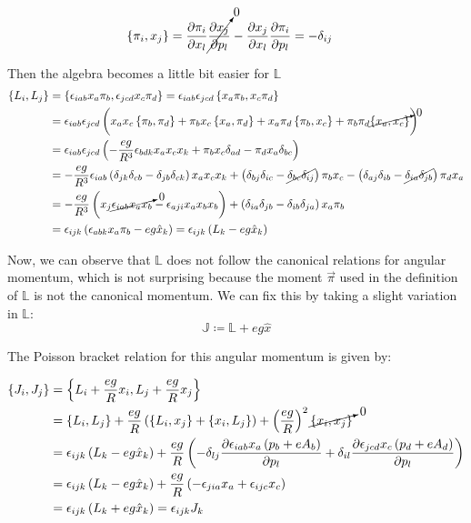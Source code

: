 \begin{align*}
\left\lbrace \pi_i, x_j \right\rbrace &= \frac{\partial \pi_i}{\partial x_l}\cancelto{0}{\frac{\partial x_j}{\partial p_l}} - \frac{\partial x_j}{\partial x_l}\frac{\partial \pi_i}{\partial p_l} =  -\delta_{ij}
\end{align*}

Then the algebra becomes a little bit easier for $\mathbb{L}$
\begin{align*}
\left\lbrace L_i, L_j \right\rbrace &= \left\lbrace \epsilon_{iab}x_a\pi_b, \epsilon_{jcd}x_c\pi_d \right\rbrace = \epsilon_{iab}\epsilon_{jcd}\left\lbrace x_a\pi_b, x_c\pi_d \right\rbrace\\
&= \epsilon_{iab}\epsilon_{jcd}\left( x_ax_c\left\lbrace \pi_b, \pi_d \right\rbrace+\pi_bx_c\left\lbrace x_a, \pi_d \right\rbrace            +x_a\pi_d\left\lbrace \pi_b, x_c \right\rbrace + \pi_b\pi_d\cancelto{0}{\left\lbrace x_a, x_c \right\rbrace} \right)\\
&= \epsilon_{iab}\epsilon_{jcd}\left( -\frac{eg}{R^3}\epsilon_{bdk}x_ax_cx_k+\pi_bx_c\delta_{ad}-\pi_dx_a\delta_{bc} \right)\\
&= -\frac{eg}{R^3}\epsilon_{iab}\left( \delta_{jk}\delta_{cb} - \delta_{jb}\delta_{ck} \right)x_ax_cx_k + \left( \delta_{bj}\delta_{ic} - \cancel{\delta_{bc}\delta_{ij}} \right)\pi_bx_c - \left( \delta_{aj}\delta_{ib} - \cancel{\delta_{ia}\delta_{jb}} \right)\pi_dx_a\\
& = -\frac{eg}{R^3}\left( x_j\cancelto{0}{\epsilon_{iab}x_ax_b}-\epsilon_{aji}x_a{x_bx_b} \right)             +\left( \delta_{ia}\delta_{jb}-\delta_{ib}\delta_{ja} \right)x_a\pi_b\\
& = \epsilon_{ijk}\left( \epsilon_{abk}x_a\pi_b-{eg}\hat{x}_k \right) = \epsilon_{ijk}\left( L_k-{eg}\hat{x}_k \right)
\end{align*}

Now, we can observe that $\mathbb{L}$ does not follow the canonical relations for angular momentum, which is not surprising because the moment $\vec{\pi}$ used in the definition of $\mathbb{L}$ is not the canonical momentum. We can fix this by taking a slight variation in $\mathbb{L}$:\\

\begin{equation}
\mathbb{J} \coloneqq \mathbb{L} + eg\hat{x}
\label{eq:ham poincarevec}
\end{equation}

The Poisson bracket relation for this angular momentum is given by:

\begin{align*}
\left\lbrace J_i, J_j \right\rbrace &= \left\lbrace L_i + \frac{eg}{R}x_i, L_j + \frac{eg}{R}x_j \right\rbrace\\
&= \left\lbrace L_i, L_j \right\rbrace + \frac{eg}{R}\left( \left\lbrace L_i, x_j \right\rbrace +\left\lbrace x_i, L_j \right\rbrace \right) + \left( \frac{eg}{R} \right)^2\cancelto{0}{\left\lbrace x_i, x_j \right\rbrace}\\
& = \epsilon_{ijk}\left( L_k-{eg}\hat{x}_k \right)+\frac{eg}{R}\left( -\delta_{lj}\frac{\partial \epsilon_{iab}x_a\left( p_b+eA_b \right)}{\partial p_l}+ \delta_{il}\frac{\partial\epsilon_{jcd}x_c\left( p_d+eA_d \right)}{\partial p_l} \right)\\
& = \epsilon_{ijk}\left( L_k-{eg}\hat{x}_k \right)+ \frac{eg}{R}\left( -\epsilon_{jia}x_a+\epsilon_{ijc}x_c \right)\\
&= \epsilon_{ijk}\left( L_k+{eg}\hat{x}_k \right) = \epsilon_{ijk}J_k
\end{align*}

